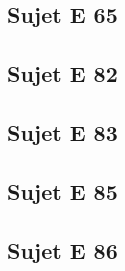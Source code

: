 \subsection*{Sujet E 65}





\subsection*{Sujet E 82}





\subsection*{Sujet E 83}





\subsection*{Sujet E 85}





\subsection*{Sujet E 86}





